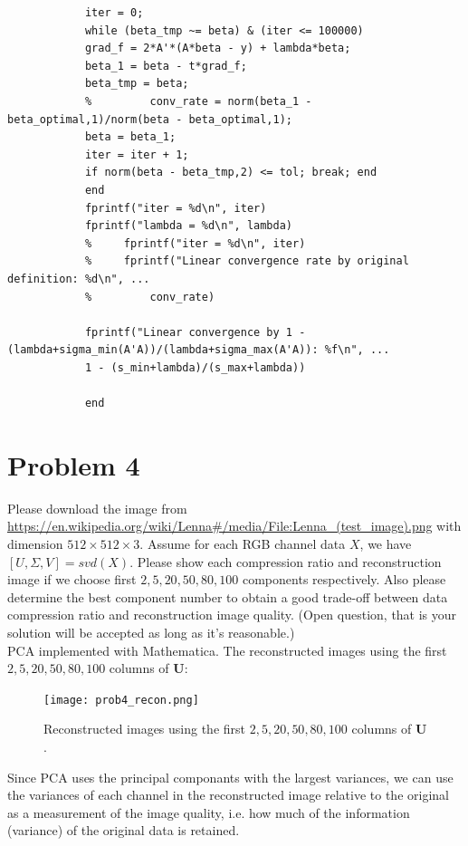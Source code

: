 \documentclass[11pt]{article}
\newcommand{\mtx}[1]{\mathbf{#1}}
\def \mU {\mtx{U}}
\begin{document}
\begin{enumerate}
\begin{verbatim}
			iter = 0;
			while (beta_tmp ~= beta) & (iter <= 100000)
			grad_f = 2*A'*(A*beta - y) + lambda*beta;
			beta_1 = beta - t*grad_f;
			beta_tmp = beta;
			%         conv_rate = norm(beta_1 - beta_optimal,1)/norm(beta - beta_optimal,1);
			beta = beta_1;
			iter = iter + 1;
			if norm(beta - beta_tmp,2) <= tol; break; end
			end
			fprintf("iter = %d\n", iter)
			fprintf("lambda = %d\n", lambda)
			%     fprintf("iter = %d\n", iter)
			%     fprintf("Linear convergence rate by original definition: %d\n", ...
			%         conv_rate)
			
			fprintf("Linear convergence by 1 - (lambda+sigma_min(A'A))/(lambda+sigma_max(A'A)): %f\n", ...
			1 - (s_min+lambda)/(s_max+lambda))
			
			end
		\end{verbatim}
		
		
	\end{enumerate}
	\vspace{4cm}
	
	\section*{Problem 4}
	Please download the image from \url{https://en.wikipedia.org/wiki/Lenna#/media/File:Lenna_(test_image).png} with dimension $512\times512\times3$. Assume for each RGB channel data $X$, we have $[U,\Sigma,V]=svd(X)$. Please show each compression ratio and reconstruction image if we choose first $2, 5, 20, 50,80,100$ components respectively. Also please determine the best component number to obtain a good trade-off between data compression ratio and reconstruction image quality. (Open question, that is your solution will be accepted as long as it's reasonable.)\\
	
	PCA implemented with Mathematica. The reconstructed images using the first $2, 5, 20, 50,80,100$ columns of $\mU$:
	
	\begin{figure}[H] %
		\centering\texttt{[image: prob4\_recon.png]}
		\caption{Reconstructed images using the first $2, 5, 20, 50,80,100$ columns of $\mU$.} %
		\label{fig:fig3}  %
	\end{figure}

	Since PCA uses the principal componants with the largest variances, we can use the variances of each channel in the reconstructed image relative to the original as a measurement of the image quality, i.e. how much of the information (variance) of the original data is retained.
	
\end{document}
